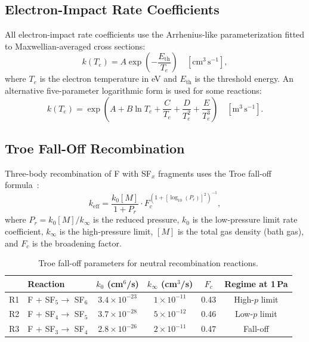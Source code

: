\documentclass[11pt,a4paper]{report}
\newcommand{\Te}{T_e}
\begin{document}
\subsection{Electron-Impact Rate Coefficients}

All electron-impact rate coefficients use the Arrhenius-like parameterization fitted to Maxwellian-averaged cross sections:
\begin{equation}
  k(\Te) = A \exp\!\left(-\frac{E_\mathrm{th}}{\Te}\right) \quad [\text{cm}^3\,\text{s}^{-1}],
  \label{eq:arrhenius}
\end{equation}
where $\Te$ is the electron temperature in eV and $E_\mathrm{th}$ is the threshold energy.  An alternative five-parameter logarithmic form is used for some reactions:
\begin{equation}
  k(\Te) = \exp\!\left(A + B\ln \Te + \frac{C}{\Te} + \frac{D}{\Te^2} + \frac{E}{\Te^3}\right) \quad [\text{m}^3\,\text{s}^{-1}].
  \label{eq:druyvesteyn-rate}
\end{equation}

\subsection{Troe Fall-Off Recombination}

Three-body recombination of F with SF$_x$ fragments uses the Troe fall-off formula~\cite{Ryan1990}:
\begin{equation}
  \boxed{k_\mathrm{eff} = \frac{k_0[M]}{1 + P_r} \cdot F_c^{\left(1+\left[\log_{10}(P_r)\right]^2\right)^{-1}},}
  \label{eq:troe}
\end{equation}
where $P_r = k_0[M]/k_\infty$ is the reduced pressure, $k_0$ is the low-pressure limit rate coefficient, $k_\infty$ is the high-pressure limit, $[M]$ is the total gas density (bath gas), and $F_c$ is the broadening factor.

\begin{table}[H]
\centering
\caption{Troe fall-off parameters for neutral recombination reactions.}
\label{tab:troe}
\begin{tabular}{clcccc}
\toprule
& \textbf{Reaction} & $k_0$ (cm$^6$/s) & $k_\infty$ (cm$^3$/s) & $F_c$ & \textbf{Regime at 1\,Pa} \\
\midrule
R1 & F + SF$_5 \to$ SF$_6$ & $3.4\times10^{-23}$ & $1\times10^{-11}$ & 0.43 & High-$p$ limit \\
R2 & F + SF$_4 \to$ SF$_5$ & $3.7\times10^{-28}$ & $5\times10^{-12}$ & 0.46 & Low-$p$ limit \\
R3 & F + SF$_3 \to$ SF$_4$ & $2.8\times10^{-26}$ & $2\times10^{-11}$ & 0.47 & Fall-off \\
\bottomrule
\end{tabular}
\end{table}
\end{document}
